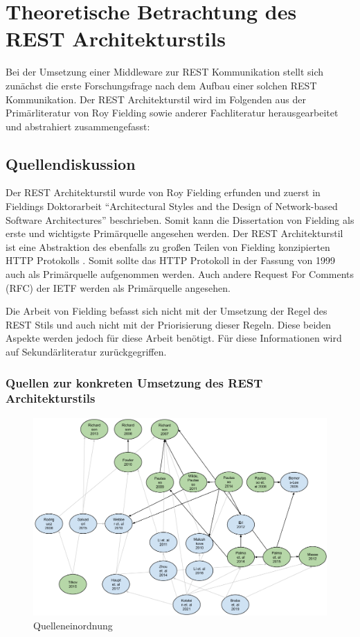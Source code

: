 \chapter{Theoretische Betrachtung des REST Architekturstils}

Bei der Umsetzung einer Middleware zur REST Kommunikation stellt sich zunächst die erste Forschungsfrage nach dem Aufbau einer solchen REST Kommunikation. Der REST Architekturstil wird im Folgenden aus der Primärliteratur von Roy Fielding sowie anderer Fachliteratur herausgearbeitet und abstrahiert zusammengefasst:

\section{Quellendiskussion}

Der REST Architekturstil wurde von Roy Fielding erfunden und zuerst in Fieldings Doktorarbeit “Architectural Styles and the Design of Network-based Software Architectures” beschrieben. Somit kann die Dissertation von Fielding als erste und wichtigste Primärquelle angesehen werden. Der REST Architekturstil ist eine Abstraktion des ebenfalls zu großen Teilen von Fielding konzipierten HTTP Protokolls . Somit sollte das HTTP Protokoll in der Fassung von 1999 auch als Primärquelle aufgenommen werden. Auch andere Request For Comments (RFC) der IETF werden als Primärquelle angesehen. 

Die Arbeit von Fielding befasst sich nicht mit der Umsetzung der Regel des REST Stils und auch nicht mit der Priorisierung dieser Regeln. Diese beiden Aspekte werden jedoch für diese Arbeit benötigt. Für diese Informationen wird auf Sekundärliteratur zurückgegriffen. 

\subsection{Quellen zur konkreten Umsetzung des REST Architekturstils}

\begin{figure}[htb]
\centering
\includegraphics[width=\textwidth]{graphics/quelleneinordnung.png}
\caption[quelleneinordnung]{Quelleneinordnung}
\label{abb:QuellenEinordnung}
\end{figure}


